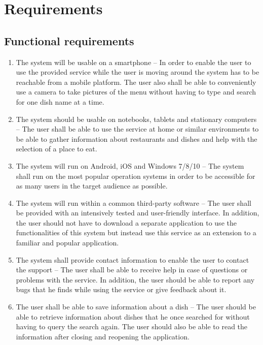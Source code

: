 \section{Requirements}
\subsection{Functional requirements}
\begin{enumerate}[label=A.\arabic*]
\item The system will be usable on a smartphone – In order to enable the user to use the provided service while the user is moving around the system has to be reachable from a mobile platform. The user also shall be able to conveniently use a camera to take pictures of the menu without having to type and search for one dish name at a time. \newline
\item The system should be usable on notebooks, tablets and stationary computers – The user shall be able to use the service at home or similar environments to be able to gather information about restaurants and dishes and help with the selection of a place to eat. \newline
\item The system will run on Android, iOS and Windows 7/8/10 – The system shall run on the most popular operation systems in order to be accessible for as many users in the target audience as possible. \newline
\item The system will run within a common third-party software – The user shall be provided with an intensively tested and user-friendly interface. In addition, the user should not have to download a separate application to use the functionalities of this system but instead use this service as an extension to a familiar and popular application. \newline
\item The system shall provide contact information to enable the user to contact the support – The user shall be able to receive help in case of questions or problems with the service. In addition, the user should be able to report any bugs that he finds while using the service or give feedback about it. \newline
\item The user shall be able to save information about a dish – The user should be able to retrieve information about dishes that he once searched for without having to query the search again. The user should also be able to read the information after closing and reopening the application. \newline

\end{enumerate}
